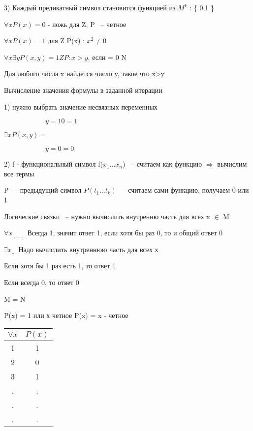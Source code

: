 \documentclass[russian]{lecture-notes}
\begin{document}
    3) Каждый предикатный символ становится функцией из $M^{k}$ : \{ 0,1 \}

    \begin{example}

        $\forall x P(x) = 0 $ - ложь для Z, P ~-- четное

        $\forall x P(x) = 1$ для Z P(x) : $x^{2} \neq 0 $

        $\forall x \exists y P(x,y) = 1 ZP:x>y$, если = 0 N


        \end{example}

    Для любого числа x найдется число y, такое что x>y

    Вычисление значения формулы в заданной итерации

    1) нужно выбрать значение несвязных переменных

    $\qquad \qquad \qquad y = 10 = 1$

    $\exists x P(x,y) = $

    $\qquad \qquad \qquad y = 0 = 0$

    2) f - функциональный символ f($x_{1} \dots x_{n}$) ~-- считаем как функцию $\Rightarrow$ вычислим все термы

    P ~-- предыдущий символ $P(t_{1} \dots t_{k})$ ~-- считаем сами функцию, получаем 0 или 1

    Логические связки ~-- нужно вычислить внутренню часть для всех x $\in $ M

    $\forall x_{ \dots \dots \dots }$ Всегда 1, значит ответ 1, если хотя бы раз 0, то и общий ответ 0

    $\exists x_{ \dots }$ Надо вычислить внутреннюю часть для всех х

    Если хотя бы 1 раз есть 1, то ответ 1

    Если всегда 0, то ответ 0

    M = N

    P(x) = 1 или х четное \qquad \qquad P(x) = x - четное

    \begin{table}[h!]
                \centering
                \begin{tabular}{|c|c|}
                    \hline
                    $\forall x$ & $P(x)$ \\ \hline
                    1      & 1       \\ \hline
                    2      & 0       \\ \hline
                    3      & 1       \\ \hline
                    .      & .       \\ \hline
                    .      & .       \\ \hline
                    .      & .       \\ \hline
                \end{tabular}
            \end{table}
\end{document}
